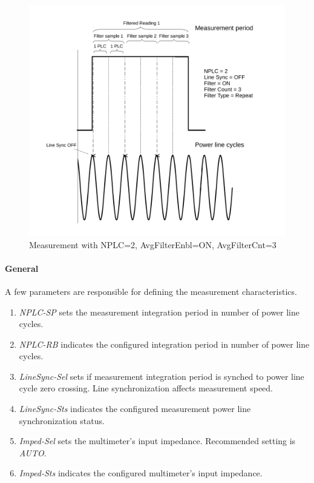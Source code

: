 \documentclass[openany]{article}
\begin{document}
		\begin{figure}[!h]
			\caption{Measurement with NPLC=2, AvgFilterEnbl=ON, AvgFilterCnt=3}
			\label{fig:meas-param2}
			\centering
			\includegraphics[width=1.0\textwidth]{dcct-meas-param2-image}
		\end{figure}
\FloatBarrier

		\paragraph{General} A few parameters are responsible for defining the measurement characteristics.

			\begin{enumerate}
				\item \emph{NPLC-SP} sets the measurement integration period in number of power line cycles.
				\item \emph{NPLC-RB} indicates the configured integration period in number of power line cycles.
				\item \emph{LineSync-Sel} sets if measurement integration period is synched to power line cycle zero crossing. Line synchronization affects measurement speed.
				\item \emph{LineSync-Sts} indicates the configured measurement power line synchronization status.
				\item \emph{Imped-Sel} sets the multimeter's input impedance. Recommended setting is \emph{AUTO}.
				\item \emph{Imped-Sts} indicates the configured multimeter's input impedance.
			\end{enumerate}
\end{document}
